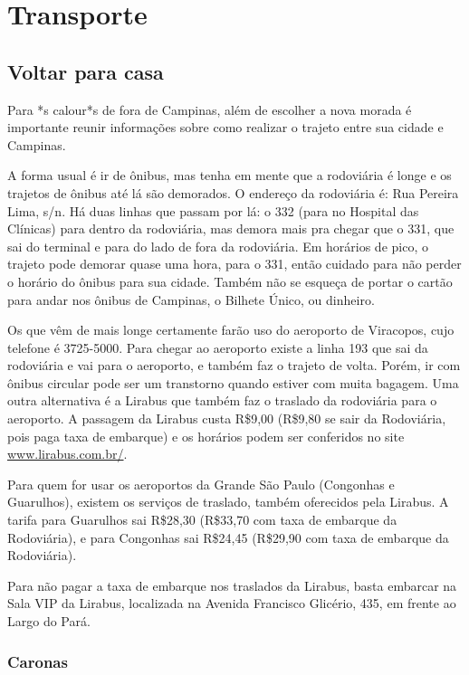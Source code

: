 
\section{Transporte}
\subsection{Voltar para casa}

Para *s calour*s de fora de Campinas, além de escolher a nova morada é
importante reunir informações sobre como realizar o trajeto entre sua cidade e
Campinas.

A forma usual é ir de ônibus, mas tenha em mente que a rodoviária é longe e os
trajetos de ônibus até lá são demorados. O endereço da rodoviária é: Rua Pereira
Lima, s/n. Há duas linhas que passam por lá: o 332 (para no Hospital das
Clínicas) para dentro da rodoviária, mas demora mais pra chegar que o 331, que
sai do terminal e para do lado de fora da rodoviária. Em horários de pico, o
trajeto pode demorar quase uma hora, para o 331, então cuidado para não perder o
horário do ônibus para sua cidade. Também não se esqueça de portar o cartão para
andar nos ônibus de Campinas, o Bilhete Único, ou dinheiro.

Os que vêm de mais longe certamente farão uso do aeroporto de Viracopos, cujo
telefone é 3725-5000. Para chegar ao aeroporto existe a linha 193 que sai da
rodoviária e vai para o aeroporto, e também faz o trajeto de volta. Porém, ir
com ônibus circular pode ser um transtorno quando estiver com muita bagagem. Uma
outra alternativa é a Lirabus que também faz o traslado da rodoviária para o
aeroporto. A passagem da Lirabus custa R\$9,00 (R\$9,80 se sair da Rodoviária,
pois paga taxa de embarque) e os horários podem ser conferidos no site
\url{www.lirabus.com.br/}.

Para quem for usar os aeroportos da Grande São Paulo (Congonhas e Guarulhos),
existem os serviços de traslado, também oferecidos pela Lirabus. A tarifa para
Guarulhos sai R\$28,30 (R\$33,70 com taxa de embarque da Rodoviária), e para
Congonhas sai R\$24,45 (R\$29,90 com taxa de embarque da Rodoviária).

Para não pagar a taxa de embarque nos traslados da Lirabus, basta embarcar na
Sala VIP da Lirabus, localizada na Avenida Francisco Glicério, 435, em frente ao
Largo do Pará.

\subsubsection{Caronas}

